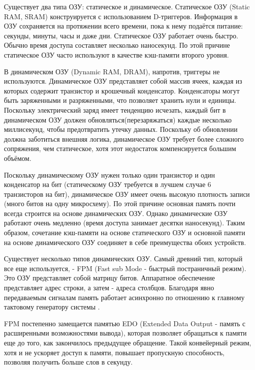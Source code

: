 Существует два типа ОЗУ: статическое и динамическое. Статическое ОЗУ (Static RAM, SRAM) конструируется с использованием D-триггеров. Информация в ОЗУ сохраняется на протяжении всего времени, пока к нему подаётся питание: секунды, минуты, часы и даже дни. Статическое ОЗУ работает очень быстро. Обычно время доступа составляет несколько наносекунд. По этой причине статическое ОЗУ часто используют в качестве кэш-памяти второго уровня.

В динамическом ОЗУ (Dynamic RAM, DRAM), напротив, триггеры не используются. Динамическое ОЗУ представляет собой массив ячеек, каждая из которых содержит транзистор и крошечный конденсатор. Конденсаторы могут быть заряженными и разряженными, что позволяет хранить нули и единицы. Поскольку электрический  заряд имеет тенденцию исчезать, каждый бит в динамическом ОЗУ должен обновляться(перезаряжаться) каждые несколько миллисекунд, чтобы предотвратить утечку данных. Поскольку об обновлении должна заботиться внешняя логика, динамическое ОЗУ требует более сложного сопряжения, чем статическое, хотя этот недостаток компенсируется большим объёмом.

Поскольку динамическому ОЗУ нужен только один транзистор и один конденсатор на бит (статическому ОЗУ требуется в лучшем случае 6 транзисторов на бит), динамическое ОЗУ имеет очень высокую плотность записи (много битов на одну микросхему). По этой причине основная память почти всегда строится на основе динамических ОЗУ. Однако динамические ОЗУ работают очень медленно (время доступа занимает десятки наносекунд). Таким образом, сочетание кэш-памяти на основе статического ОЗУ и основной памяти на основе динамического ОЗУ соединяет в себе преимущества обоих устройств.

Существует несколько типов динамических ОЗУ. Самый древний тип, который все еще используется, - FPM (Fast sub Mode - быстрый постраничный режим). Это ОЗУ представляет собой матрицу битов. Аппаратное обеспечение представляет адрес строки, а затем - адреса столбцов. Благодаря явно передаваемым сигналам память работает асинхронно по отношению к главному тактовому генератору системы \cite{dram_book}.

FPM постепенно замещается памятью EDO (Extended Data Output - память с расширенными возможностями вывода), которая позволяет обращаться к памяти еще до того, как закончилось предыдущее обращение. Такой конвейерный режим, хотя и не ускоряет доступ к памяти, повышает пропускную способность, позволяя получить больше слов в секунду.

